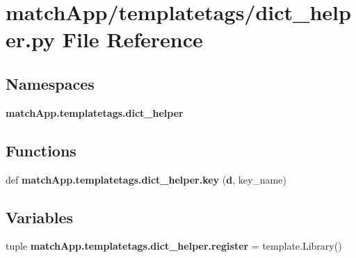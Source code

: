 \section{match\+App/templatetags/dict\+\_\+helper.py File Reference}
\label{dict__helper_8py}
\subsection*{Namespaces}
\begin{DoxyCompactItemize}
\item 
 {\bf match\+App.\+templatetags.\+dict\+\_\+helper}
\end{DoxyCompactItemize}
\subsection*{Functions}
\begin{DoxyCompactItemize}
\item 
def {\bf match\+App.\+templatetags.\+dict\+\_\+helper.\+key} ({\bf d}, key\+\_\+name)
\end{DoxyCompactItemize}
\subsection*{Variables}
\begin{DoxyCompactItemize}
\item 
tuple {\bf match\+App.\+templatetags.\+dict\+\_\+helper.\+register} = template.\+Library()
\end{DoxyCompactItemize}
